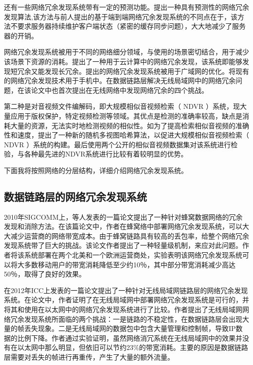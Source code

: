 还有一些网络冗余发现系统带有一定的预测功能。\cite{Zohar2014}提出一种具有预测性的网络冗余发现算法,该方法与前人提出的基于端到端网络冗余发现系统的不同点在于，该方法不要求服务器持续维护客户端状态（紧密的缓存同步问题），大大地减少了服务器的开销。

网络冗余发现系统被用于不同的网络细分领域，与使用的场景密切结合，用于减少该场景下资源的消耗。\cite{Lei2013Cooperative}提出了一种用于云计算中的网络冗余发现，该系统即能够发现短冗余又能发现长冗余。\cite{Aggarwal2010EndRE}提出的网络冗余发现系统被用于广域网的优化。\cite{Sanadhya2012}将现有的网络冗余发现技术用于手机中。\cite{Halepovic2012}在数据链路层解决无线局域网中的网络冗余问题，在该论文中也首次提出在无线网络中发现网络冗余的四个挑战。

第二种是对音视频文件编解码，即大规模相似音视频检索（ NDVR ）系统，现大量应用于版权保护，特定视频检测等领域。其优点是检测的准确率较高，缺点是消耗大量的资源，无法实时地检测视频的相似性。如\cite{Hao2016Stochastic}为了提高检索相似音视频的准确性和速度，提出了一种新的随机多视图哈希算法，以促进大规模相似音视频检索（ NDVR ）系统的构建。最后使用两个公开的相似音视频数据集对该系统进行检验，与各种最先进的NDVR系统进行比较有着较明显的优势。

下面我将按照网络的分层结构，详细介绍网络冗余发现系统。
\subsection{数据链路层的网络冗余发现系统}
2010年SIGCOMM上，\cite{Lumezanu2010The}等人发表的一篇论文提出了一种针对蜂窝数据网络的冗余发现和消除方法。在该篇论文中，作者在蜂窝络中部署网络冗余发现系统，可以大大减少运营商的网络带宽成本。由于蜂窝链路具有较高的丢包率，给整个网络冗余发现系统带了巨大的挑战。该论文作者提出了一种轻量级机制，来应对此问题。作者将该系统部署在两个北美和一个欧洲运营商处，实验表明该网络冗余发现系统可以将大多数移动用户的带宽消耗降低至少约10％，其中部分带宽消耗减少高达50％，取得了良好的效果。

\cite{Halepovic2012}在2012年ICC上发表的一篇论文提出了一种针对无线局域网链路层的网络冗余发现系统。在论文中，作者证明了在无线局域网中部署网络冗余发现系统是可行的，并将其和使用在以太网中的网络冗余发现系统进行了比较。作者提出了无线局域网网络冗余发现系统所面临的两个挑战：一是链路的不稳定性，在数据链路层会出现大量的帧丢失现象。二是无线局域网的数据包中包含大量管理和控制帧，导致IP数据的比例下降。作者通过实验证明，虽然网络消冗系统在无线局域网中的效果并没有在以太网中那么明显，但依旧可以节约23\%的带宽消耗。主要的原因是数据链路层需要对丢失的帧进行再重传，产生了大量的额外流量。

